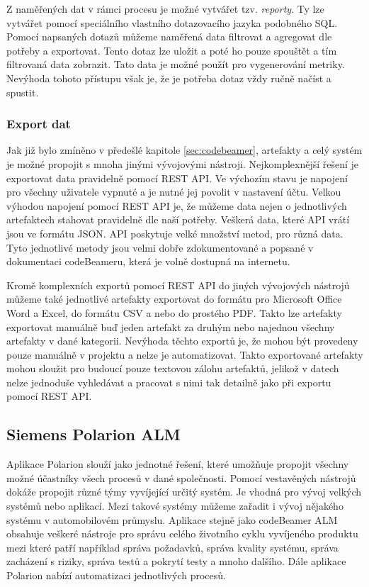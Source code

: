 \documentclass[czech,master,public,dept460,male,cpdeclaration,oneside]{diploma}
\begin{document}
Z naměřených dat v rámci procesu je možné vytvářet tzv. \textit{reporty}. Ty lze vytvářet pomocí speciálního vlastního dotazovacího jazyka podobného SQL. Pomocí napsaných dotazů můžeme naměřená data filtrovat a agregovat dle potřeby a exportovat. Tento dotaz lze uložit a poté ho pouze spouštět a tím filtrovaná data zobrazit. Tato data je možné použít pro vygenerování metriky. Nevýhoda tohoto přístupu však je, že je potřeba dotaz vždy ručně načíst a spustit.

\subsubsection{Export dat}
Jak již bylo zmíněno v předešlé kapitole \ref{sec:codebeamer}, artefakty a celý systém je možné propojit s mnoha jinými vývojovými nástroji. Nejkomplexnější řešení je exportovat data pravidelně pomocí REST API. Ve výchozím stavu je napojení pro všechny uživatele vypnuté a je nutné jej povolit v nastavení účtu. Velkou výhodou napojení pomocí REST API je, že můžeme data nejen o jednotlivých artefaktech stahovat pravidelně dle naší potřeby. Veškerá data, které API vrátí jsou ve formátu JSON. API poskytuje velké množství metod, pro různá data. Tyto jednotlivé metody jsou velmi dobře zdokumentované a popsané v dokumentaci codeBeameru, která je volně dostupná na internetu.  \cite{ref:codebeamer_rest}

Kromě komplexních exportů pomocí REST API do jiných vývojových nástrojů můžeme také jednotlivé artefakty exportovat do formátu pro Microsoft Office Word a Excel, do formátu CSV a nebo do prostého PDF. Takto lze artefakty exportovat manuálně buď jeden artefakt za druhým nebo najednou všechny artefakty v dané kategorii. Nevýhoda těchto exportů je, že mohou být provedeny pouze manuálně v projektu a nelze je automatizovat. Takto exportované artefakty mohou sloužit pro budoucí pouze textovou zálohu artefaktů, jelikož v datech nelze jednoduše vyhledávat a pracovat s nimi tak detailně jako při exportu pomocí REST API. 


\subsection{Siemens Polarion ALM}
Aplikace Polarion slouží jako jednotné řešení, které umožňuje propojit všechny možné účastníky všech procesů v dané společnosti. Pomocí vestavěných nástrojů dokáže propojit různé týmy vyvíjející určitý systém. Je vhodná pro vývoj velkých systémů nebo aplikací. Mezi takové systémy můžeme zařadit i vývoj nějakého systému v automobilovém průmyslu. Aplikace stejně jako codeBeamer ALM obsahuje veškeré nástroje pro správu celého životního cyklu vyvíjeného produktu mezi které patří například správa požadavků, správa kvality systému, správa zacházení s riziky, správa testů a pokrytí testy a mnoho dalšího. Dále aplikace Polarion nabízí automatizaci jednotlivých procesů. \cite{ref:polarion_about}
\end{document}
